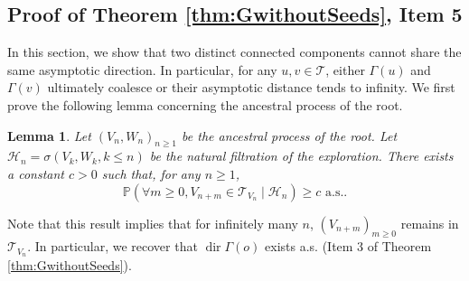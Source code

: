 \documentclass[french]{article}
\newtheorem{lemma}[theorem]{Lemma}
\renewcommand{\P}{\mathbb{P}}
\newcommand{\T}{\mathcal{T}}
\renewcommand{\dir}{\mathop{dir}}
\renewcommand{\1}{\mathds{1}}
\begin{document}
\subsection{Proof of Theorem \ref{thm:GwithoutSeeds}, Item 5}


In this section, we show that two distinct connected components cannot share the same asymptotic direction. In particular, for any $u,v\in \T$, either $\Gamma(u)$ and $\Gamma(v)$ ultimately coalesce or their asymptotic distance tends to infinity.
We first prove the following lemma concerning the ancestral process of the root.

\begin{lemma} \label{lemm:VncondHn} Let $(V_n, W_n)_{n\ge 1}$ be the ancestral process of the root. Let $\mathcal{H}_n=\sigma(V_k,W_k, k\le n)$ be the natural filtration of the exploration. There exists a constant $c>0$ such that, for any $n\ge 1$,
$$\P(\forall m\ge 0, V_{n+m}\in \T_{V_n} \mid \mathcal{H}_n)\ge c \mbox{ a.s.}.$$
\end{lemma}

Note that this result implies that for infinitely many $n$, $(V_{n+m})_{m\ge 0}$ remains in $\T_{V_n}$. In particular, we recover that $\dir \Gamma(o)$ exists a.s. (Item 3 of Theorem \ref{thm:GwithoutSeeds}).
\end{document}
